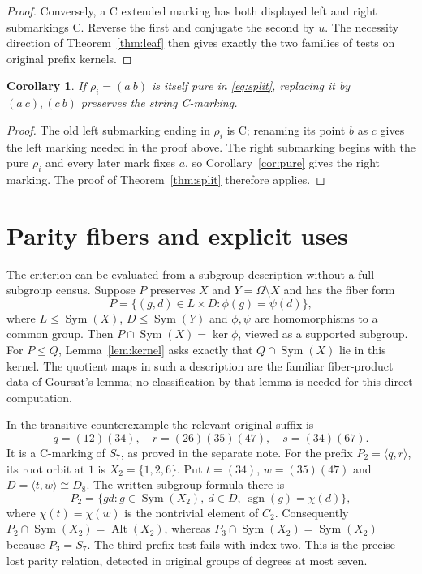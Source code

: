 \documentclass[a4paper,11pt]{article}
\newcommand{\Sym}{\operatorname{Sym}}\newcommand{\Alt}{\operatorname{Alt}}
\newcommand{\gen}[1]{\langle#1\rangle}
\newtheorem{corollary}[theorem]{Corollary}
\begin{document}
\begin{proof}
Conversely, a C extended marking has both displayed left and right
submarkings C. Reverse the first and conjugate the second by $u$.
The necessity direction of Theorem~\ref{thm:leaf} then gives exactly
the two families of tests on original prefix kernels.
\end{proof}

\begin{corollary}\label{cor:subdivide}
If $\rho_i=(a\ b)$ is itself pure in \eqref{eq:split}, replacing it
by $(a\ c),(c\ b)$ preserves the string C-marking.
\end{corollary}
\begin{proof}
The old left submarking ending in $\rho_i$ is C; renaming its point
$b$ as $c$ gives the left marking needed in the proof above. The
right submarking begins with the pure $\rho_i$ and every later mark
fixes $a$, so Corollary~\ref{cor:pure} gives the right marking. The
proof of Theorem~\ref{thm:split} therefore applies.
\end{proof}

\section{Parity fibers and explicit uses}
The criterion can be evaluated from a subgroup description without a
full subgroup census. Suppose $P$ preserves $X$ and $Y=\Omega\setminus X$
and has the fiber form
\[
 P=\{(g,d)\in L\times D:\phi(g)=\psi(d)\},
\]
where $L\leq\Sym(X)$, $D\leq\Sym(Y)$ and $\phi,\psi$ are
homomorphisms to a common group. Then
$P\cap\Sym(X)=\ker\phi$, viewed as a supported subgroup.
For $P\leq Q$, Lemma~\ref{lem:kernel} asks exactly that
$Q\cap\Sym(X)$ lie in this kernel. The quotient maps in such a
description are the familiar fiber-product data of Goursat's lemma;
no classification by that lemma is needed for this direct computation.

In the transitive counterexample the relevant original suffix is
\[
 q=(12)(34),\quad r=(26)(35)(47),\quad s=(34)(67).
\]
It is a C-marking of $S_7$, as proved in the separate note. For the
prefix $P_2=\gen{q,r}$, its root orbit at $1$ is $X_2=\{1,2,6\}$.
Put $t=(34)$, $w=(35)(47)$ and $D=\gen{t,w}\cong D_8$.
The written subgroup formula there is
\[
 P_2=\{g d:g\in\Sym(X_2),\ d\in D,\ \operatorname{sgn}(g)=\chi(d)\},
\]
where $\chi(t)=\chi(w)$ is the nontrivial element of $C_2$.
Consequently $P_2\cap\Sym(X_2)=\Alt(X_2)$, whereas
$P_3\cap\Sym(X_2)=\Sym(X_2)$ because $P_3=S_7$.
The third prefix test fails with index two. This is the precise lost
parity relation, detected in original groups of degrees at most seven.
\end{document}
